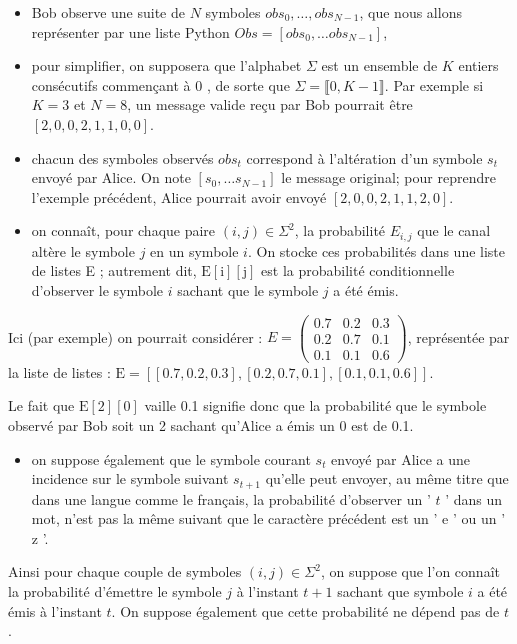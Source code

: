 \documentclass[10pt]{article}
\begin{document}
\begin{itemize}
  \item Bob observe une suite de $N$ symboles $o b s_{0}, \ldots, o b s_{N-1}$, que nous allons représenter par une liste Python $O b s=\left[o b s_{0}, \ldots o b s_{N-1}\right]$,
  \item pour simplifier, on supposera que l'alphabet $\Sigma$ est un ensemble de $K$ entiers consécutifs commençant à 0 , de sorte que $\Sigma=\llbracket 0, K-1 \rrbracket$. Par exemple si $K=3$ et $N=8$, un message valide reçu par Bob pourrait être $[2,0,0,2,1,1,0,0]$.
  \item chacun des symboles observés $o b s_{t}$ correspond à l'altération d'un symbole $s_{t}$ envoyé par Alice. On note $\left[s_{0}, \ldots s_{N-1}\right]$ le message original; pour reprendre l'exemple précédent, Alice pourrait avoir envoyé $[2,0,0,2,1,1,2,0]$.
  \item on connaît, pour chaque paire $(i, j) \in \Sigma^{2}$, la probabilité $E_{i, j}$ que le canal altère le symbole $j$ en un symbole $i$. On stocke ces probabilités dans une liste de listes E ; autrement dit, $\mathrm{E}[\mathrm{i}][\mathrm{j}]$ est la probabilité conditionnelle d'observer le symbole $i$ sachant que le symbole $j$ a été émis.
\end{itemize}

Ici (par exemple) on pourrait considérer : $E=\left(\begin{array}{ccc}0.7 & 0.2 & 0.3 \\ 0.2 & 0.7 & 0.1 \\ 0.1 & 0.1 & 0.6\end{array}\right)$, représentée par la liste de listes : $\mathrm{E}=[[0.7,0.2,0.3],[0.2,0.7,0.1],[0.1,0.1,0.6]]$.

Le fait que $\mathrm{E}[2][0]$ vaille 0.1 signifie donc que la probabilité que le symbole observé par Bob soit un 2 sachant qu'Alice a émis un 0 est de 0.1.

\begin{itemize}
  \item on suppose également que le symbole courant $s_{t}$ envoyé par Alice a une incidence sur le symbole suivant $s_{t+1}$ qu'elle peut envoyer, au même titre que dans une langue comme le français, la probabilité d'observer un ' $t$ ' dans un mot, n'est pas la même suivant que le caractère précédent est un ' e ' ou un ' z '.
\end{itemize}

Ainsi pour chaque couple de symboles $(i, j) \in \Sigma^{2}$, on suppose que l'on connaît la probabilité d'émettre le symbole $j$ à l'instant $t+1$ sachant que symbole $i$ a été émis à l'instant $t$. On suppose également que cette probabilité ne dépend pas de $t$.
\end{document}
